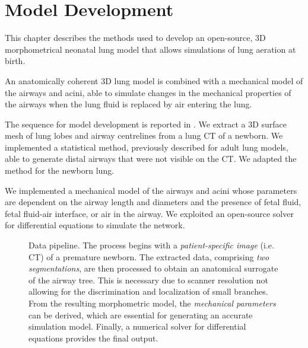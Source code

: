 
\section{Model Development}



This chapter describes the methods used to develop an open-source, 3D
morphometrical neonatal lung model that allows simulations of lung
aeration at birth.

An anatomically coherent 3D lung model is combined with a mechanical
model of the airways and acini, able to simulate changes in the
mechanical properties of the airways when the lung fluid is replaced
by air entering the lung.

The sequence for model development is reported in
. We extract a 3D surface mesh of lung lobes
and airway centrelines from a lung CT of a newborn. We implemented a
statistical method, previously described for adult lung models, able
to generate distal airways that were not visible on the CT. We adapted
the method for the newborn lung.

We implemented a mechanical model of the airways and acini whose
parameters are dependent on the airway length and diameters and the
presence of fetal fluid, fetal fluid-air interface, or air in the
airway. We exploited an open-source solver for differential equations
to simulate the network.

\begin{figure}[H]\centering
  
  \caption{Data pipeline.  The process begins with a
    \emph{patient-specific image} (i.e. CT) of a premature newborn.
    The extracted data, comprising \emph{two segmentations}, are then
    processed to obtain an anatomical surrogate of the airway tree.
    This is necessary due to scanner resolution not allowing for the
    discrimination and localization of small branches.  From the
    resulting morphometric model, the \emph{mechanical parameters} can
    be derived, which are essential for generating an accurate
    simulation model.  Finally, a numerical solver for differential
    equations provides the final output.}
  \label{fig:data_pipeline}
\end{figure}
  
